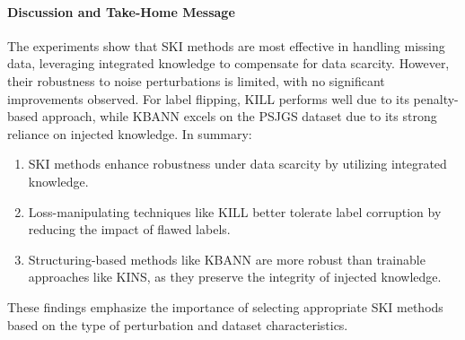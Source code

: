 \paragraph{Discussion and Take-Home Message}
%
The experiments show that \gls{SKI} methods are most effective in handling missing data, leveraging integrated knowledge to compensate for data scarcity.
%
However, their robustness to noise perturbations is limited, with no significant improvements observed.
%
For label flipping, \gls{KILL} performs well due to its penalty-based approach, while \gls{KBANN} excels on the \gls{PSJGS} dataset due to its strong reliance on injected knowledge.
%
In summary:
%
\begin{enumerate}
    \item \gls{SKI} methods enhance robustness under data scarcity by utilizing integrated knowledge.
    \item Loss-manipulating techniques like \gls{KILL} better tolerate label corruption by reducing the impact of flawed labels.
    \item Structuring-based methods like \gls{KBANN} are more robust than trainable approaches like \gls{KINS}, as they preserve the integrity of injected knowledge.
\end{enumerate}
%
These findings emphasize the importance of selecting appropriate \gls{SKI} methods based on the type of perturbation and dataset characteristics.